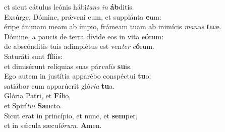 \oddverse et sicut cátulus leónis hábi\textit{tans} \textit{in} \textbf{áb}ditis.\\
\evenverse Exsúrge, Dómine, prǽveni eum, et supplánta \textbf{e}um:~\*\\
\evenverse éripe ánimam meam ab ímpio, frámeam tuam ab inimícis \textit{ma}\textit{nus} \textbf{tu}æ.\\
\oddverse Dómine, a paucis de terra dívide eos in vita e\textbf{ó}rum:~\*\\
\oddverse de abscónditis tuis adimplétus est ven\textit{ter} \textit{e}\textbf{ó}rum.\\
\evenverse Saturáti sunt \textbf{fí}liis:~\*\\
\evenverse et dimisérunt relíquias suas pár\textit{vu}\textit{lis} \textbf{su}is.\\
\oddverse Ego autem in justítia apparébo conspéctui \textbf{tu}o:~\*\\
\oddverse satiábor cum apparúerit gló\textit{ri}\textit{a} \textbf{tu}a.\\
\evenverse Glória Patri, et \textbf{Fí}lio,~\*\\
\evenverse et Spirí\textit{tu}\textit{i} \textbf{San}cto.\\
\oddverse Sicut erat in princípio, et nunc, et \textbf{sem}per,~\*\\
\oddverse et in sǽcula sæcu\textit{ló}\textit{rum}. \textbf{A}men.\\
